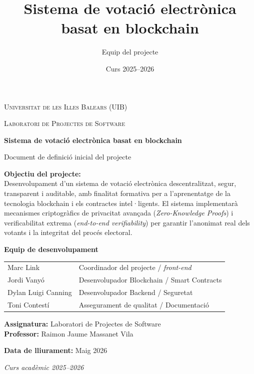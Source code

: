 \documentclass[12pt,a4paper,catalan]{article}
\title{Sistema de votació electrònica basat en blockchain}
\author{Equip del projecte}
\date{Curs 2025--2026}
\begin{document}
\begin{titlepage}
    \centering

    {\scshape\LARGE Universitat de les Illes Balears (UIB)\par}
    \vspace{0.5cm}
    {\scshape\Large Laboratori de Projectes de Software\par}
    \vspace{2cm}

    {\huge\bfseries Sistema de votació electrònica basat en blockchain\par}
    \vspace{0.5cm}
    {\Large Document de definició inicial del projecte\par}

    \vspace{2cm}

    \textbf{Objectiu del projecte:}\\
    Desenvolupament d'un sistema de votació electrònica descentralitzat,
    segur, transparent i auditable, amb finalitat formativa per a l'aprenentatge
    de la tecnologia blockchain i els contractes intel·ligents. El sistema implementarà
    mecanismes criptogràfics de privacitat avançada (\textit{Zero-Knowledge Proofs})
    i verificabilitat extrema (\textit{end-to-end verifiability}) per garantir
    l'anonimat real dels votants i la integritat del procés electoral.

    \vfill

    \textbf{Equip de desenvolupament}\par
    \vspace{0.3cm}
    \begin{tabular}{ll}
        Marc Link     & Coordinador del projecte / \textit{front-end} \\
        Jordi Vanyó   & Desenvolupador Blockchain / Smart Contracts \\
        Dylan Luigi Canning & Desenvolupador Backend / Seguretat \\
        Toni Contestí & Assegurament de qualitat / Documentació \\
    \end{tabular}

    \vspace{1.5cm}

    \textbf{Assignatura:} Laboratori de Projectes de Software\\
    \textbf{Professor:} Raimon Jaume Massanet Vila

    \vspace{1cm}

    \textbf{Data de lliurament:} Maig 2026

    \vfill

    \textit{Curs acadèmic 2025--2026}
\end{titlepage}
\end{document}
